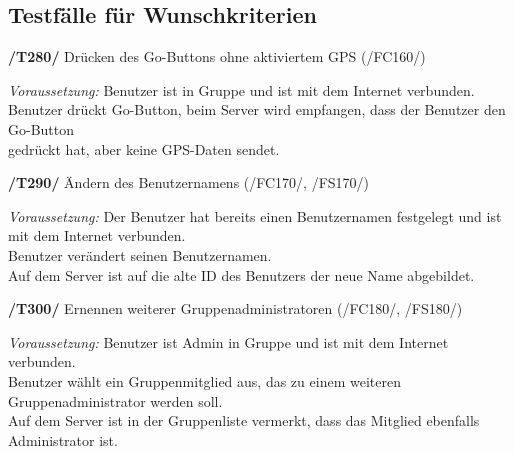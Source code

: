 \subsection{Testfälle für Wunschkriterien}

\textbf{/T280/} Drücken des Go-Buttons ohne aktiviertem GPS (/FC160/)\\
\begin{center}
\vspace{-\parskip}
\begin{minipage}[t]{0.9\textwidth}
\emph{Voraussetzung:} Benutzer ist in Gruppe und ist mit dem Internet verbunden.           \\
Benutzer drückt Go-Button, beim Server wird empfangen, dass der Benutzer den Go-Button\\
gedrückt hat, aber keine GPS-Daten sendet.                                             \\
\end{minipage}
\end{center}

\textbf{/T290/} Ändern des Benutzernamens (/FC170/, /FS170/)\\
\begin{center}
\vspace{-\parskip}
\begin{minipage}[t]{0.9\textwidth}
\emph{Voraussetzung:} Der Benutzer hat bereits einen Benutzernamen festgelegt und ist mit dem Internet verbunden.\\
Benutzer verändert seinen Benutzernamen.                                                                   \\
Auf dem Server ist auf die alte ID des Benutzers der neue Name abgebildet.                                  \\
\end{minipage}
\end{center}

\textbf{/T300/} Ernennen weiterer Gruppenadministratoren (/FC180/, /FS180/)\\
\begin{center}
\vspace{-\parskip}
\begin{minipage}[t]{0.9\textwidth}
\emph{Voraussetzung:} Benutzer ist Admin in Gruppe und ist mit dem Internet verbunden.\\
Benutzer wählt ein Gruppenmitglied aus, das zu einem weiteren Gruppenadministrator werden soll.\\
Auf dem Server ist in der Gruppenliste vermerkt, dass das Mitglied ebenfalls Administrator ist.\\
\end{minipage}
\end{center}

